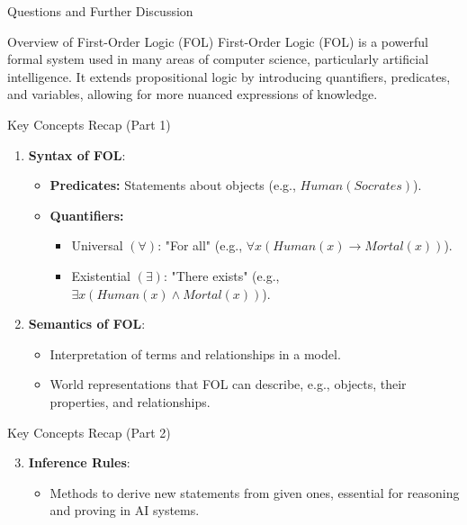 \documentclass[aspectratio=169]{beamer}
\begin{document}
\begin{frame}[fragile]{Questions and Further Discussion}
    \begin{block}{Overview of First-Order Logic (FOL)}
        First-Order Logic (FOL) is a powerful formal system used in many areas of computer science, particularly artificial intelligence. It extends propositional logic by introducing quantifiers, predicates, and variables, allowing for more nuanced expressions of knowledge.
    \end{block}
\end{frame}

\begin{frame}[fragile]{Key Concepts Recap (Part 1)}
    \begin{enumerate}
        \item \textbf{Syntax of FOL}:
            \begin{itemize}
                \item \textbf{Predicates:} Statements about objects (e.g., $Human(Socrates)$).
                \item \textbf{Quantifiers:}
                    \begin{itemize}
                        \item Universal $(\forall)$: "For all" (e.g., $\forall x (Human(x) \rightarrow Mortal(x))$).
                        \item Existential $(\exists)$: "There exists" (e.g., $\exists x (Human(x) \land Mortal(x))$).
                    \end{itemize}
            \end{itemize}

        \item \textbf{Semantics of FOL}:
            \begin{itemize}
                \item Interpretation of terms and relationships in a model.
                \item World representations that FOL can describe, e.g., objects, their properties, and relationships.
            \end{itemize}
    \end{enumerate}
\end{frame}

\begin{frame}[fragile]{Key Concepts Recap (Part 2)}
    \begin{enumerate}
        \setcounter{enumi}{2}
        \item \textbf{Inference Rules}:
            \begin{itemize}
                \item Methods to derive new statements from given ones, essential for reasoning and proving in AI systems.
            \end{itemize}
    \end{enumerate}
\end{frame}
\end{document}
